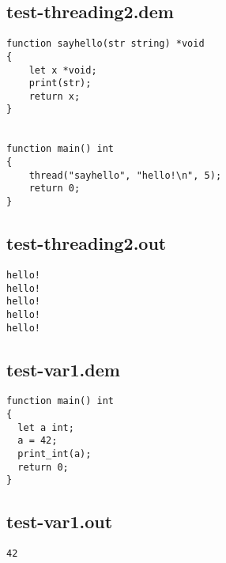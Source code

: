 \subsection{test-threading2.dem}
\begin{lstlisting}
function sayhello(str string) *void
{
    let x *void;
    print(str);
    return x;
}


function main() int
{
    thread("sayhello", "hello!\n", 5);
    return 0;
}
\end{lstlisting}
\subsection{test-threading2.out}
\begin{lstlisting}
hello!
hello!
hello!
hello!
hello!
\end{lstlisting}
\subsection{test-var1.dem}
\begin{lstlisting}
function main() int
{
  let a int;
  a = 42;
  print_int(a);
  return 0;
}
\end{lstlisting}
\subsection{test-var1.out}
\begin{lstlisting}
42
\end{lstlisting}


